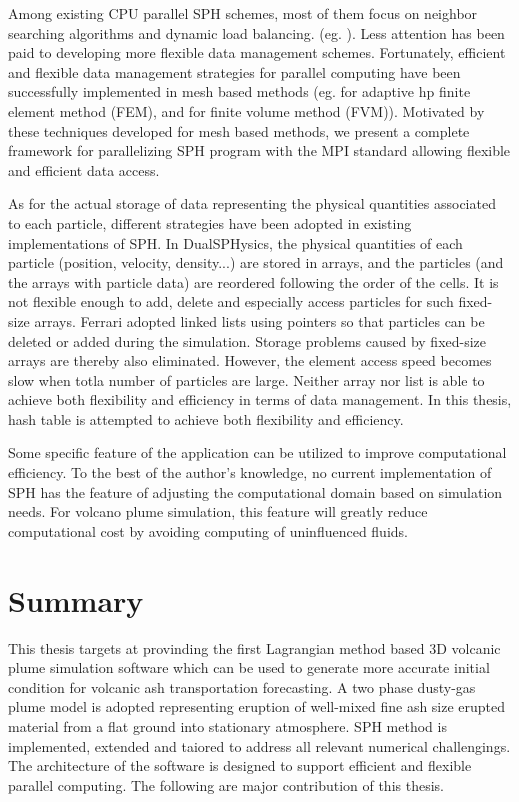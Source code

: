 Among existing CPU parallel SPH schemes, most of them focus on neighbor searching algorithms and dynamic load balancing. (eg. \cite{ferrari2009new, crespo2015dualsphysics}). Less attention has been paid to developing more flexible data management schemes.
Fortunately, efficient and flexible data management strategies for parallel computing have been successfully implemented in mesh based methods (eg. \cite{laszloffy2000simple} for adaptive hp finite element method (FEM), and \cite{patra2005parallel} for finite volume method (FVM)). Motivated by these techniques developed for mesh based methods, we present a complete framework for parallelizing SPH program with the MPI standard allowing flexible and efficient data access.

As for the actual storage of data representing the physical quantities associated to each particle, different strategies have been adopted in existing implementations of SPH. 
In DualSPHysics\cite{crespo2015dualsphysics}, the physical quantities of each particle (position, velocity, density...) are stored in arrays, and the particles (and the arrays with particle data) are reordered following the order of the cells. It is not flexible enough to add, delete and especially access particles for such fixed-size arrays. Ferrari\cite{ferrari2009new} adopted linked lists using pointers so that particles can be deleted or added during the simulation. Storage problems caused by fixed-size arrays are thereby also eliminated. However, the element access speed becomes slow when totla number of particles are large. Neither array nor list is able to achieve both flexibility and efficiency in terms of data management. In this thesis, hash table is attempted to achieve both flexibility and efficiency.

Some specific feature of the application can be utilized to improve computational efficiency. To the best of the author's knowledge, no current implementation of SPH has the feature of adjusting the computational domain based on simulation needs. For volcano plume simulation, this feature will greatly reduce computational cost by avoiding computing of uninfluenced fluids.

\section{Summary}
This thesis targets at provinding the first Lagrangian method based 3D volcanic plume simulation software which can be used to generate more accurate initial condition for volcanic ash transportation forecasting. A two phase dusty-gas plume model is adopted representing eruption of well-mixed fine ash size erupted material from a flat ground into stationary atmosphere. SPH method is implemented, extended and taiored to address all relevant numerical challengings. The architecture of the software is designed to support efficient and flexible parallel computing. The following are major contribution of this thesis.

